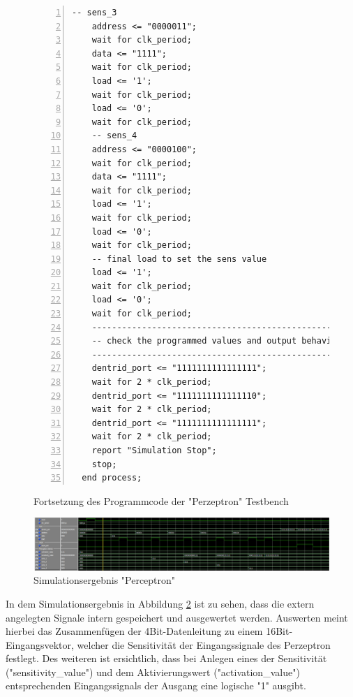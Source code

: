 \documentclass{article}
\numberwithin{equation}{section}
\begin{document}
\begin{figure}[htbp]
    \begin{lstlisting}[style=VHDL,numbers=left,stepnumber=1,style=myCustomMatlabStyle,basicstyle=\footnotesize]
    -- sens_3
    address <= "0000011";
    wait for clk_period;
    data <= "1111";
    wait for clk_period;
    load <= '1';
    wait for clk_period;
    load <= '0';
    wait for clk_period;
    -- sens_4
    address <= "0000100";
    wait for clk_period;
    data <= "1111";
    wait for clk_period;
    load <= '1';
    wait for clk_period;
    load <= '0';
    wait for clk_period;
    -- final load to set the sens value
    load <= '1';
    wait for clk_period;
    load <= '0';
    wait for clk_period;
    ------------------------------------------------------
    -- check the programmed values and output behaviour --
    ------------------------------------------------------
    dentrid_port <= "1111111111111111";
    wait for 2 * clk_period;
    dentrid_port <= "1111111111111110";
    wait for 2 * clk_period;
    dentrid_port <= "1111111111111111";
    wait for 2 * clk_period;
    report "Simulation Stop";
    stop;
  end process;  
\end{lstlisting}
\caption{Fortsetzung des Programmcode der "Perzeptron" Testbench} \label{code:perceptron_testbench_2}
\end{figure}
\FloatBarrier
\begin{figure}[htb!]
    \begin{center}
      \includegraphics[width=15cm]{SimulationPictures/perceptron_sim.png}
    \end{center}
    \caption{Simulationsergebnis "Perceptron"} \label{fig:perceptron_sim}
  \end{figure}
\FloatBarrier
In dem Simulationsergebnis in Abbildung \ref{fig:perceptron_sim} ist zu sehen, dass die
extern angelegten Signale intern gespeichert und ausgewertet werden. Auswerten meint
hierbei das Zusammenfügen der 4Bit-Datenleitung zu einem 16Bit-Eingangsvektor, welcher
die Sensitivität der Eingangssignale des Perzeptron festlegt. Des weiteren ist ersichtlich,
dass bei Anlegen eines der Sensitivität ("sensitivity\_value") und dem Aktivierungswert
("activation\_value") entsprechenden Eingangssignals der Ausgang eine logische "1"
ausgibt.
\pagebreak
\end{document}
